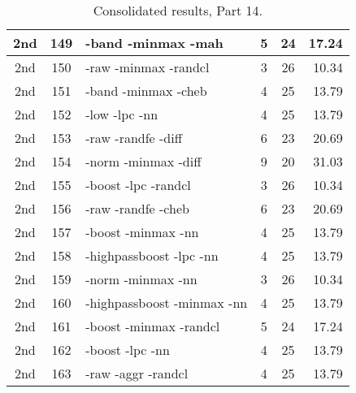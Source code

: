 \begin{table}
\begin{minipage}[b]{\textwidth}
\begin{tabular}{|c|c|l|c|c|r|}
2nd & 149 & -band -minmax -mah  & 5 & 24 & 17.24\\ \hline
2nd & 150 & -raw -minmax -randcl  & 3 & 26 & 10.34\\ \hline
2nd & 151 & -band -minmax -cheb  & 4 & 25 & 13.79\\ \hline
2nd & 152 & -low -lpc -nn  & 4 & 25 & 13.79\\ \hline
2nd & 153 & -raw -randfe -diff  & 6 & 23 & 20.69\\ \hline
2nd & 154 & -norm -minmax -diff  & 9 & 20 & 31.03\\ \hline
2nd & 155 & -boost -lpc -randcl  & 3 & 26 & 10.34\\ \hline
2nd & 156 & -raw -randfe -cheb  & 6 & 23 & 20.69\\ \hline
2nd & 157 & -boost -minmax -nn  & 4 & 25 & 13.79\\ \hline
2nd & 158 & -highpassboost -lpc -nn  & 4 & 25 & 13.79\\ \hline
2nd & 159 & -norm -minmax -nn  & 3 & 26 & 10.34\\ \hline
2nd & 160 & -highpassboost -minmax -nn  & 4 & 25 & 13.79\\ \hline
2nd & 161 & -boost -minmax -randcl  & 5 & 24 & 17.24\\ \hline
2nd & 162 & -boost -lpc -nn  & 4 & 25 & 13.79\\ \hline
2nd & 163 & -raw -aggr -randcl  & 4 & 25 & 13.79\\ \hline
\end{tabular}
\end{minipage}
\caption{Consolidated results, Part 14.}
\label{tab:results14}
\end{table}


